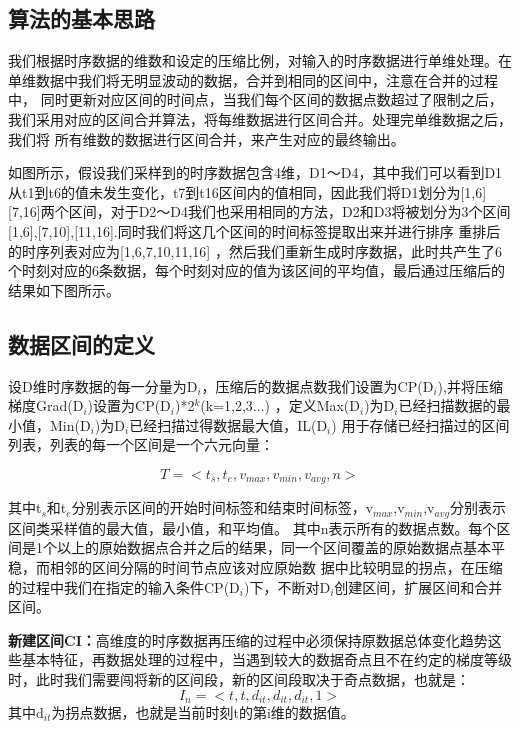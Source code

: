 \subsection{算法的基本思路}
\label{section 4.12}

我们根据时序数据的维数和设定的压缩比例，对输入的时序数据进行单维处理。在单维数据中我们将无明显波动的数据，合并到相同的区间中，注意在合并的过程中，
同时更新对应区间的时间点，当我们每个区间的数据点数超过了限制之后，我们采用对应的区间合并算法，将每维数据进行区间合并。处理完单维数据之后，我们将
所有维数的数据进行区间合并，来产生对应的最终输出。

如图所示，假设我们采样到的时序数据包含4维，D1～D4，其中我们可以看到D1从t1到t6的值未发生变化，t7到t16区间内的值相同，因此我们将D1划分为[1,6]
[7,16]两个区间，对于D2～D4我们也采用相同的方法，D2和D3将被划分为3个区间[1,6],[7,10],[11,16].同时我们将这几个区间的时间标签提取出来并进行排序
重排后的时序列表对应为[1,6,7,10,11,16]
，然后我们重新生成时序数据，此时共产生了6个时刻对应的6条数据，每个时刻对应的值为该区间的平均值，最后通过压缩后的结果如下图所示。

\subsection{数据区间的定义}
\label{sectoin 4.13}

设D维时序数据的每一分量为D$_{i}$，压缩后的数据点数我们设置为CP(D$_{i}$),并将压缩梯度Grad(D$_{i}$)设置为CP(D$_{i}$)*2$^{k}$(k=1,2,3...)
，定义Max(D$_{i}$)为D$_{i}$已经扫描数据的最小值，Min(D$_{i}$)为D$_{i}$已经扫描过得数据最大值，IL(D$_{i}$)
用于存储已经扫描过的区间列表，列表的每一个区间是一个六元向量：


\begin{equation}
T=<t_{s},t_{e},v_{max},v_{min},v_{avg},n>
\end{equation}


其中t$_{s}$和t$_{e}$分别表示区间的开始时间标签和结束时间标签，v$_{max}$,v$_{min}$,v$_{avg}$分别表示区间类采样值的最大值，最小值，和平均值。
其中n表示所有的数据点数。每个区间是1个以上的原始数据点合并之后的结果，同一个区间覆盖的原始数据点基本平稳，而相邻的区间分隔的时间节点应该对应原始数
据中比较明显的拐点，在压缩的过程中我们在指定的输入条件CP(D$_{i}$)下，不断对D$_{i}$创建区间，扩展区间和合并区间。


\textbf{新建区间CI：}高维度的时序数据再压缩的过程中必须保持原数据总体变化趋势这些基本特征，再数据处理的过程中，当遇到较大的数据奇点且不在约定的梯度等级时，此时我们需要闯将新的区间段，新的区间段取决于奇点数据，也就是：
\begin{equation}
I_{n}=<t,t,d_{it},d_{it},d_{it},1>
\end{equation}
其中d$_{it}$为拐点数据，也就是当前时刻t的第i维的数据值。

